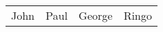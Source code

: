 \documentclass[twocolumn]{article}
\begin{document}
\timetravelenable

\lipsum[1-13]

\begin{timetravel}
\begin{table*}
  \begin{tabular}{p{30mm}p{30mm}p{30mm}p{30mm}}
    John & Paul & George & Ringo
  \end{tabular}
\end{table*}
\end{timetravel}
\end{document}
